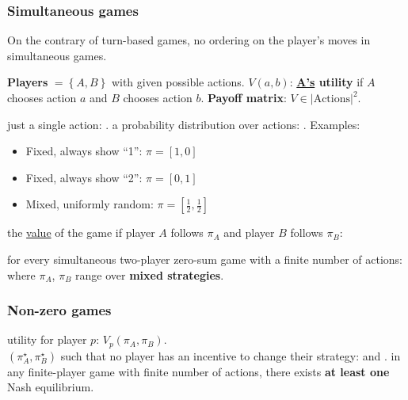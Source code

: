 \subsubsection{Simultaneous games}

On the contrary of turn-based games, no ordering on the player's moves in
simultaneous games.

 \textbf{Players} $= \left\{A, B\right\}$
with given possible actions. \textbf{$V(a,b)$}: \textbf{\underline{A's} utility}
if $A$ chooses action $a$ and $B$ chooses action $b$. \textbf{Payoff matrix}: $V
\in |\text{Actions}|^2$.

 just a single action: .
 a probability distribution over actions:
. Examples:
\begin{itemize}
    \item Fixed, always show ``1'': $\pi = [1,0]$
    \item Fixed, always show ``2'': $\pi = [0,1]$
    \item Mixed, uniformly random: $\pi = [\frac{1}{2}, \frac{1}{2}]$
\end{itemize}

 the \underline{value} of the game if player $A$ follows
$\pi_A$ and player $B$ follows $\pi_B$:

 for every simultaneous two-player zero-sum
game with a finite number of actions:
 where
$\pi_A$, $\pi_B$ range over \textbf{mixed strategies}.

\subsubsection{Non-zero games}

 utility for player $p$: $V_p(\pi_A, \pi_B)$.\\
 $(\pi_A^\star, \pi_B^\star)$ such that no player has an
incentive to change their strategy:
 and
.
 in any finite-player game with finite number of
actions, there exists \textbf{at least one} Nash equilibrium.